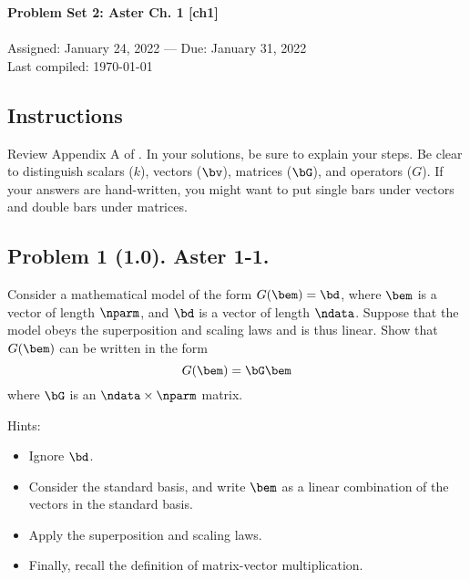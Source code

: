 \documentclass[11pt,titlepage,fleqn]{article}
\begin{document}

\begin{spacing}{1.2}
\centering
{\large \bf Problem Set 2: Aster Ch. 1 [ch1]} \\
\cltag\ \\
Assigned: January 24, 2022 --- Due: January 31, 2022 \\
Last compiled: \today
\end{spacing}


\subsection*{Instructions}

Review Appendix A of \citet{Aster}. In your solutions, be sure to explain your steps. Be clear to distinguish scalars ($k$), vectors ($\bv$), matrices ($\bG$), and operators ($G$). If your answers are hand-written, you might want to put single bars under vectors and double bars under matrices.

\subsection*{Problem 1 (1.0). Aster 1-1.}

Consider a mathematical model of the form $G(\bem) = \bd$, where $\bem$ is a vector of length $\nparm$, and $\bd$ is a vector of length $\ndata$. Suppose that the model obeys the superposition and scaling laws and is thus linear. Show that $G(\bem)$ can be written in the form
%
\begin{equation}
G(\bem) = \bG\bem
\end{equation}
%
where $\bG$ is an $\ndata \times \nparm$ matrix.

\medskip\noindent
Hints:
%
\begin{itemize}
\item Ignore $\bd$.
\item Consider the standard basis, and write $\bem$ as a linear combination of the vectors in the standard basis.
\item Apply the superposition and scaling laws.
\item Finally, recall the definition of matrix-vector multiplication.
\end{itemize}

\end{document}
